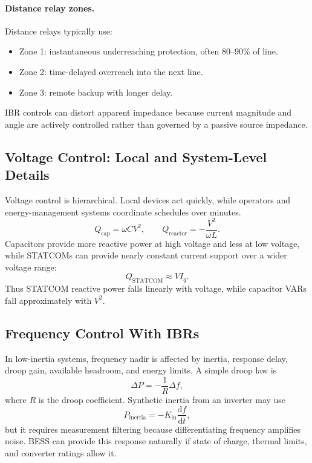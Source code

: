 \documentclass[11pt]{article}
\newcommand{\dd}{\mathrm{d}}
\begin{document}
\paragraph{Distance relay zones.}
Distance relays typically use:
\begin{itemize}
  \item Zone 1: instantaneous underreaching protection, often 80--90\% of line.
  \item Zone 2: time-delayed overreach into the next line.
  \item Zone 3: remote backup with longer delay.
\end{itemize}
IBR controls can distort apparent impedance because current magnitude and angle
are actively controlled rather than governed by a passive source impedance.

\subsection{Voltage Control: Local and System-Level Details}
Voltage control is hierarchical. Local devices act quickly, while operators and
energy-management systems coordinate schedules over minutes.
\begin{equation}
Q_{\mathrm{cap}}=\omega CV^2,\qquad Q_{\mathrm{reactor}}=-\frac{V^2}{\omega L}.
\end{equation}
Capacitors provide more reactive power at high voltage and less at low voltage,
while STATCOMs can provide nearly constant current support over a wider voltage
range:
\begin{equation}
Q_{\mathrm{STATCOM}}\approx V I_q.
\end{equation}
Thus STATCOM reactive power falls linearly with voltage, while capacitor VARs
fall approximately with $V^2$.

\subsection{Frequency Control With IBRs}
In low-inertia systems, frequency nadir is affected by inertia, response delay,
droop gain, available headroom, and energy limits. A simple droop law is
\begin{equation}
\Delta P=-\frac{1}{R}\Delta f,
\end{equation}
where $R$ is the droop coefficient. Synthetic inertia from an inverter may use
\begin{equation}
P_{\mathrm{inertia}}=-K_{\mathrm{in}}\frac{\dd f}{\dd t},
\end{equation}
but it requires measurement filtering because differentiating frequency
amplifies noise. BESS can provide this response naturally if state of charge,
thermal limits, and converter ratings allow it.
\end{document}
